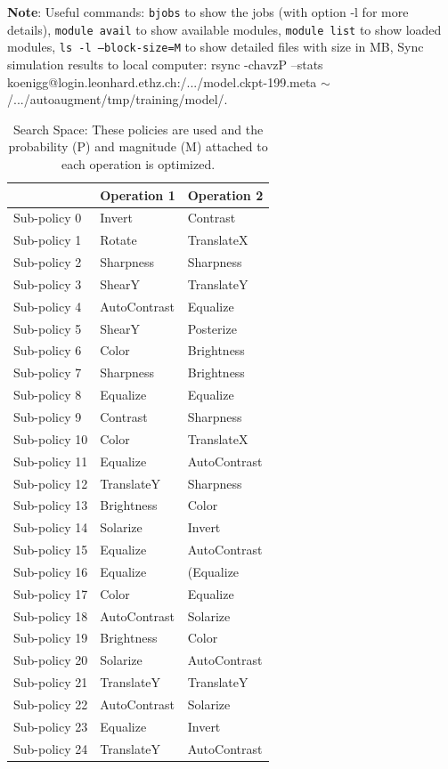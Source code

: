 \documentclass[10pt,twocolumn,letterpaper]{article}
\begin{document}
\noindent
\textbf{Note}: Useful commands: \texttt{bjobs} to show the jobs (with option -l for more details), \texttt{module avail} to show available modules, \texttt{module list} to show loaded modules, \texttt{ls -l --block-size=M} to show detailed files with size in MB, Sync simulation results to local computer: rsync -chavzP --stats koenigg@login.leonhard.ethz.ch:/.../model.ckpt-199.meta $\sim$/.../autoaugment/tmp/training/model/. \newline

\begin{table}[h]
\begin{center}
\begin{tabular}{lll}
\hline
& Operation 1 & Operation 2 \\
\hline
Sub-policy 0 & Invert & Contrast \\
Sub-policy 1 & Rotate & TranslateX \\
Sub-policy 2 & Sharpness & Sharpness \\
Sub-policy 3 & ShearY & TranslateY \\
Sub-policy 4 & AutoContrast & Equalize \\
Sub-policy 5 & ShearY & Posterize \\
Sub-policy 6 & Color & Brightness \\
Sub-policy 7 & Sharpness & Brightness \\
Sub-policy 8 & Equalize & Equalize \\
Sub-policy 9 & Contrast & Sharpness \\
Sub-policy 10 & Color & TranslateX \\
Sub-policy 11 & Equalize & AutoContrast \\
Sub-policy 12 & TranslateY & Sharpness \\
Sub-policy 13 & Brightness & Color \\
Sub-policy 14 & Solarize & Invert \\
Sub-policy 15 & Equalize & AutoContrast \\
Sub-policy 16 & Equalize & (Equalize \\
Sub-policy 17 & Color & Equalize \\
Sub-policy 18 & AutoContrast & Solarize \\
Sub-policy 19 & Brightness & Color \\
Sub-policy 20 & Solarize & AutoContrast \\
Sub-policy 21 & TranslateY & TranslateY \\
Sub-policy 22 & AutoContrast & Solarize \\
Sub-policy 23 & Equalize & Invert \\
Sub-policy 24 & TranslateY & AutoContrast \\
\hline
\end{tabular}
\caption {Search Space: These policies are used and the probability (P) and magnitude (M) attached to each operation is optimized.} \label{tab:good_policies} 
\end{center}
\end{table}

{\small


}
\end{document}

